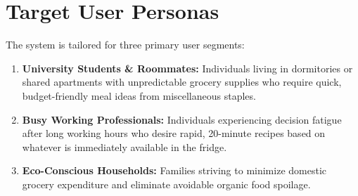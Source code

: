 \section{Target User Personas}
The system is tailored for three primary user segments:
\begin{enumerate}
    \item \textbf{University Students \& Roommates:} Individuals living in dormitories or shared apartments with unpredictable grocery supplies who require quick, budget-friendly meal ideas from miscellaneous staples.
    \item \textbf{Busy Working Professionals:} Individuals experiencing decision fatigue after long working hours who desire rapid, 20-minute recipes based on whatever is immediately available in the fridge.
    \item \textbf{Eco-Conscious Households:} Families striving to minimize domestic grocery expenditure and eliminate avoidable organic food spoilage.
\end{enumerate}
